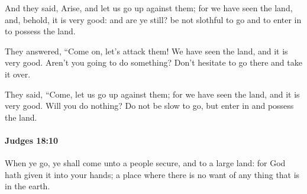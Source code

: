 			\begin{versebox}
					\item[BHS] 
					\item[ASV] And they said, Arise, and let us go up against them; for we have seen the land, and, behold, it is very good: and are ye still? be not slothful to go and to enter in to possess the land.
					\item[NIV] They answered, “Come on, let’s attack them! We have seen the land, and it is very good. Aren’t you going to do something? Don’t hesitate to go there and take it over.
					\item[NRSV] They said, “Come, let us go up against them; for we have seen the land, and it is very good. Will you do nothing? Do not be slow to go, but enter in and possess the land.
			\end{versebox}

		\paragraph{Judges 18:10} %
			\label{JUDGES-18-10}

			When ye go, ye shall come unto a people secure, and to a large land: for God hath given it into your hands; a place where there is no want of any thing that is in the earth.

